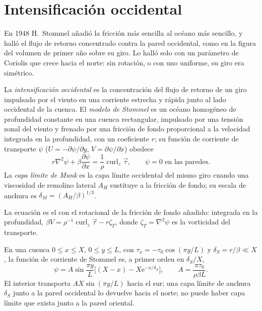 \section{Intensificación occidental}\label{sec:b3:ocean-dynamics:western}

En 1948 H.~Stommel añadió la fricción más sencilla al océano más sencillo, y
halló el flujo de retorno concentrado contra la pared occidental, como en la
figura del volumen de primer año sobre su giro. Lo halló solo con un
parámetro de Coriolis que crece hacia el norte: sin rotación, o con uno uniforme,
su giro era simétrico.

\begin{definition}\label{def:b3:ocean-dynamics:western-intensification}
La \emph{intensificación occidental} es la
concentración del flujo de retorno de un giro impulsado por el viento en una corriente
estrecha y rápida junto al lado occidental de la cuenca. El \emph{modelo de
Stommel} es un océano homogéneo de profundidad constante en una
cuenca rectangular, impulsado por una tensión zonal del viento y frenado por una
fricción de fondo proporcional a la velocidad integrada en la profundidad, con un coeficiente $r$;
su función de corriente de transporte $\psi$ ($U = -\partial\psi/\partial y$, $V =
\partial\psi/\partial x$) obedece
\[
r\nabla^2\psi + \beta\frac{\partial\psi}{\partial x} =
\frac{1}{\rho}\operatorname{curl}_z\vec\tau ,\qquad \psi = 0 \text{ en las paredes.}
\]
La \emph{capa límite de Munk} es la
capa límite occidental del mismo giro cuando una viscosidad de remolino lateral $A_H$
sustituye a la fricción de fondo; su escala de anchura es $\delta_M =
(A_H/\beta)^{1/3}$.
\end{definition}

La ecuación es el  con el rotacional de la fricción de fondo
añadido: integrada en la profundidad, $\beta V = \rho^{-1}\operatorname{curl}_z
\vec\tau - r\zeta_T$, donde $\zeta_T = \nabla^2\psi$ es la vorticidad del
transporte.

\begin{theorem}\label{thm:b3:ocean-dynamics:stommel}
En una cuenca $0 \le x \le X$, $0 \le y \le L$, con $\tau_x = -\tau_0
\cos(\pi y/L)$ y $\delta_S = r/\beta \ll X$, la función de corriente de Stommel
es, a primer orden en $\delta_S/X$,
\[
\psi = A\sin\frac{\pi y}{L}\Big[(X - x) - X\mathrm e^{-x/\delta_S}\Big],
\qquad A = \frac{\pi\tau_0}{\rho\beta L} .
\]
El interior transporta $AX\sin(\pi y/L)$ hacia el sur; una capa límite de anchura
$\delta_S$ junto a la pared occidental lo devuelve hacia el norte; no puede haber capa límite
que exista junto a la pared oriental.
\end{theorem}

